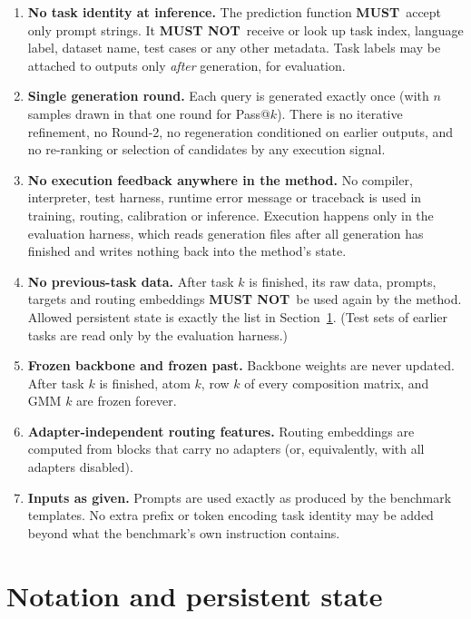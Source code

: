 \documentclass[11pt]{article}
\newcommand{\MUST}{\textbf{MUST}}
\newcommand{\MUSTNOT}{\textbf{MUST NOT}}
\begin{document}
\begin{enumerate}[label=I\arabic*., leftmargin=*]
  \item \textbf{No task identity at inference.} The prediction function \MUST\ accept only prompt strings.
        It \MUSTNOT\ receive or look up task index, language label, dataset name, test cases or any other metadata.
        Task labels may be attached to outputs only \emph{after} generation, for evaluation.
  \item \textbf{Single generation round.} Each query is generated exactly once (with $n$ samples drawn in that one
        round for Pass@$k$). There is no iterative refinement, no Round-2, no regeneration conditioned on earlier
        outputs, and no re-ranking or selection of candidates by any execution signal.
  \item \textbf{No execution feedback anywhere in the method.} No compiler, interpreter, test harness, runtime
        error message or traceback is used in training, routing, calibration or inference. Execution happens only
        in the evaluation harness, which reads generation files after all generation has finished and writes
        nothing back into the method's state.
  \item \textbf{No previous-task data.} After task $k$ is finished, its raw data, prompts, targets and routing
        embeddings \MUSTNOT\ be used again by the method. Allowed persistent state is exactly the list in
        Section~\ref{sec:state}. (Test sets of earlier tasks are read only by the evaluation harness.)
  \item \textbf{Frozen backbone and frozen past.} Backbone weights are never updated. After task $k$ is finished,
        atom $k$, row $k$ of every composition matrix, and GMM $k$ are frozen forever.
  \item \textbf{Adapter-independent routing features.} Routing embeddings are computed from blocks that carry no
        adapters (or, equivalently, with all adapters disabled).
  \item \textbf{Inputs as given.} Prompts are used exactly as produced by the benchmark templates. No extra prefix
        or token encoding task identity may be added beyond what the benchmark's own instruction contains.
\end{enumerate}

\section{Notation and persistent state}\label{sec:state}
\end{document}

